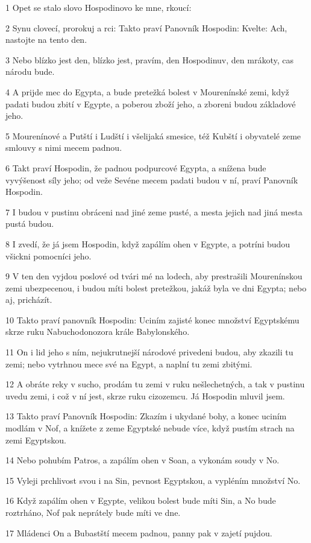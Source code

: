 \par 1 Opet se stalo slovo Hospodinovo ke mne, rkoucí:
\par 2 Synu clovecí, prorokuj a rci: Takto praví Panovník Hospodin: Kvelte: Ach, nastojte na tento den.
\par 3 Nebo blízko jest den, blízko jest, pravím, den Hospodinuv, den mrákoty, cas národu bude.
\par 4 A prijde mec do Egypta, a bude pretežká bolest v Mourenínské zemi, když padati budou zbití v Egypte, a poberou zboží jeho, a zboreni budou základové jeho.
\par 5 Mourenínové a Putští i Ludští i všelijaká smesice, též Kubští i obyvatelé zeme smlouvy s nimi mecem padnou.
\par 6 Takt praví Hospodin, že padnou podpurcové Egypta, a snížena bude vyvýšenost síly jeho; od veže Sevéne mecem padati budou v ní, praví Panovník Hospodin.
\par 7 I budou v pustinu obráceni nad jiné zeme pusté, a mesta jejich nad jiná mesta pustá budou.
\par 8 I zvedí, že já jsem Hospodin, když zapálím ohen v Egypte, a potríni budou všickni pomocníci jeho.
\par 9 V ten den vyjdou poslové od tvári mé na lodech, aby prestrašili Mourenínskou zemi ubezpecenou, i budou míti bolest pretežkou, jakáž byla ve dni Egypta; nebo aj, pricházít.
\par 10 Takto praví panovník Hospodin: Uciním zajisté konec množství Egyptskému skrze ruku Nabuchodonozora krále Babylonského.
\par 11 On i lid jeho s ním, nejukrutnejší národové privedeni budou, aby zkazili tu zemi; nebo vytrhnou mece své na Egypt, a naplní tu zemi zbitými.
\par 12 A obráte reky v sucho, prodám tu zemi v ruku nešlechetných, a tak v pustinu uvedu zemi, i což v ní jest, skrze ruku cizozemcu. Já Hospodin mluvil jsem.
\par 13 Takto praví Panovník Hospodin: Zkazím i ukydané bohy, a konec uciním modlám v Nof, a knížete z zeme Egyptské nebude více, když pustím strach na zemi Egyptskou.
\par 14 Nebo pohubím Patros, a zapálím ohen v Soan, a vykonám soudy v No.
\par 15 Vyleji prchlivost svou i na Sin, pevnost Egyptskou, a vypléním množství No.
\par 16 Když zapálím ohen v Egypte, velikou bolest bude míti Sin, a No bude roztrháno, Nof pak neprátely bude míti ve dne.
\par 17 Mládenci On a Bubastští mecem padnou, panny pak v zajetí pujdou.
